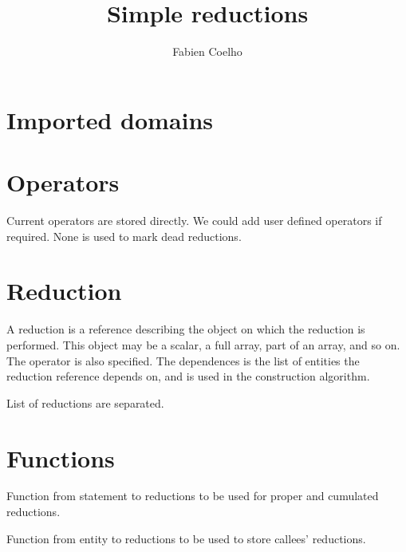 \documentclass{article}
\title{Simple reductions}
\author{Fabien Coelho}
\begin{document}
\maketitle



\section{Imported domains}
\label{sec:import}


\section{Operators}
\label{sec:operators}

Current operators are stored directly.
We could add user defined operators if required.
None is used to mark dead reductions. 



\section{Reduction}
\label{sec:reduction}

A reduction is a reference describing the object on which the reduction is
performed. This object may be a scalar, a full array, part of an array,
and so on. The operator is also specified. The dependences is the list of
entities the reduction reference depends on, and is used in the
construction algorithm. 


List of reductions are separated.



\section{Functions}
\label{sec:functions}

Function from statement to reductions to be used for proper and cumulated
reductions. 


Function from entity to reductions to be used to store callees'
reductions. 

\end{document}
